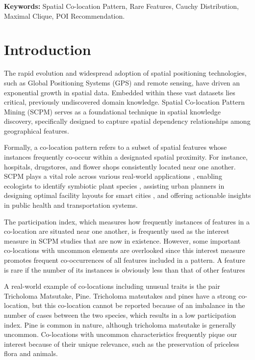 \documentclass[12pt, letterpaper]{template}
\theoremstyle{definition}
\begin{document}
\noindent\textbf{Keywords:} Spatial Co-location Pattern, Rare Features, Cauchy Distribution, Maximal Clique, POI Recommendation.
\clearpage

\tableofcontents

\clearpage

\listoffigures
\clearpage


\listoftables
\clearpage


\section{Introduction}
\label{sec:intro} 

The rapid evolution and widespread adoption of spatial positioning technologies, such as Global Positioning Systems (GPS) and remote sensing, have driven an exponential growth in spatial data. Embedded within these vast datasets lies critical, previously undiscovered domain knowledge. Spatial Co-location Pattern Mining (SCPM) serves as a foundational technique in spatial knowledge discovery, specifically designed to capture spatial dependency relationships among geographical features. 

Formally, a co-location pattern refers to a subset of spatial features whose instances frequently co-occur within a designated spatial proximity. For instance, hospitals, drugstores, and flower shops consistently located near one another. SCPM plays a vital role across various real-world applications \cite{huang2004discovering,li2016discovering,shekhar2001discovering,yang2018tsrs,yu2016spatial}, enabling ecologists to identify symbiotic plant species \cite{lu2018mining}, assisting urban planners in designing optimal facility layouts for smart cities \cite{yao2017co}, and offering actionable insights in public health and transportation systems.

The participation index, which measures how frequently instances of features in a co-location are situated near one another, is frequently used as the interest measure in SCPM studies that are now in existence. However, some important co-locations with uncommon elements are overlooked since this interest measure promotes frequent co-occurrences of all features included in a pattern. A feature is rare if the number of its instances is obviously less than that of other features 

A real-world example of co-locations including unusual traits is the pair {Tricholoma Matsutake, Pine}. Tricholoma matsutakes and pines have a strong co-location, but this co-location cannot be reported because of an imbalance in the number of cases between the two species, which results in a low participation index. Pine is common in nature, although tricholoma matsutake is generally uncommon. Co-locations with uncommon characteristics frequently pique our interest because of their unique relevance, such as the preservation of priceless flora and animals.
\end{document}
